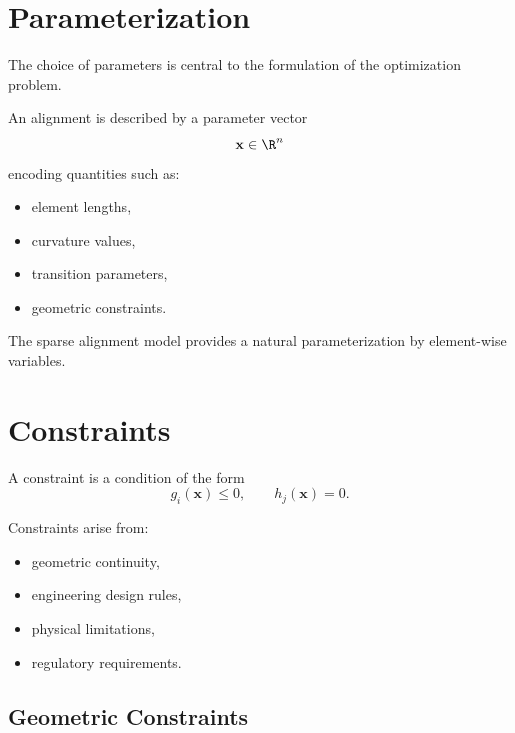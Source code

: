 \section{Parameterization}

\begin{remark}
The choice of parameters is central to the formulation of the
optimization problem.
\end{remark}

\begin{definition}
An alignment is described by a parameter vector
\[
\mathbf{x} \in \R^n
\]
encoding quantities such as:
\begin{itemize}
\item element lengths,
\item curvature values,
\item transition parameters,
\item geometric constraints.
\end{itemize}
\end{definition}

\begin{remark}
The sparse alignment model provides a natural parameterization by
element-wise variables.
\end{remark}


\section{Constraints}

\begin{definition}[Constraint]
A constraint is a condition of the form
\[
g_i(\mathbf{x}) \leq 0,
\qquad
h_j(\mathbf{x}) = 0.
\]
\end{definition}

\begin{remark}
Constraints arise from:
\begin{itemize}
\item geometric continuity,
\item engineering design rules,
\item physical limitations,
\item regulatory requirements.
\end{itemize}
\end{remark}

\subsection{Geometric Constraints}

